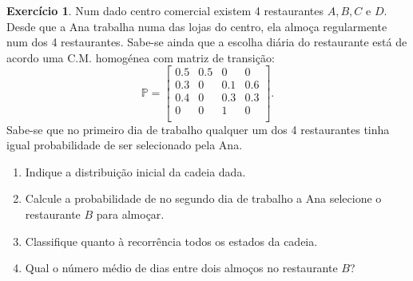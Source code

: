 \documentclass[
  11pt,
  a4paper,
]{book}
\theoremstyle{definition}
\theoremstyle{definition}
\theoremstyle{definition}
\newtheorem{exercise}{Exercício}[chapter]
\theoremstyle{definition}
\theoremstyle{remark}
\begin{document}
\begin{exercise}

Num dado centro comercial existem 4 restaurantes \(A,B,C\) e \(D\). Desde que a Ana trabalha numa das lojas do centro, ela almoça regularmente num dos 4 restaurantes. Sabe-se ainda que a escolha diária do restaurante está de acordo uma C.M. homogénea com matriz de transição:
\[
\mathbb{P} =
\begin{bmatrix}
0.5 & 0.5 & 0 & 0   \\
0.3 & 0 & 0.1 & 0.6   \\
0.4 & 0 & 0.3 & 0.3   \\
0 & 0 & 1 & 0   \\
\end{bmatrix}.
\]
Sabe-se que no primeiro dia de trabalho qualquer um dos 4 restaurantes tinha igual probabilidade de ser selecionado pela Ana.

\begin{enumerate}
\def\labelenumi{(\alph{enumi})}
\item
  Indique a distribuição inicial da cadeia dada.
\item
  Calcule a probabilidade de no segundo dia de trabalho a Ana selecione o restaurante \(B\) para almoçar.
\item
  Classifique quanto à recorrência todos os estados da cadeia.
\item
  Qual o número médio de dias entre dois almoços no restaurante \(B\)?
\end{enumerate}

\end{exercise}

\(\,\)
\end{document}
